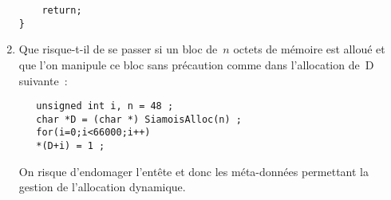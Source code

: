 \begin{enumerate}
\begin{correction}
\begin{verbatim}
	return;
}
\end{verbatim}
\end{correction}
\fi
\item Que risque-t-il de se passer si un bloc de~$n$ octets de
  m\'emoire est allou\'e et que l'on manipule ce bloc sans
  pr\'ecaution comme dans l'allocation de~D suivante~:
\begin{verbatim}
   unsigned int i, n = 48 ; 
   char *D = (char *) SiamoisAlloc(n) ;
   for(i=0;i<66000;i++)
   *(D+i) = 1 ;
\end{verbatim}
\ifcorrection
\begin{correction}
  On risque d'endomager l'ent\^ete et donc les m\'eta-donn\'ees permettant
la gestion de l'allocation dynamique.
\end{correction}
\fi
\end{enumerate}
